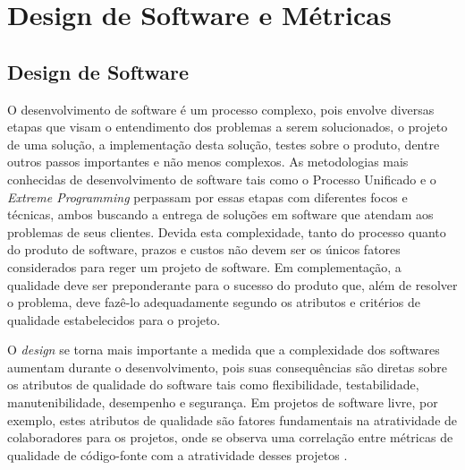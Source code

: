 \chapter{Design de Software e Métricas}
\label{cap-metrics}

\section{Design de Software}
\label{sec-design-sw}

O desenvolvimento de software é um processo complexo, pois envolve diversas etapas que visam o entendimento dos problemas a serem solucionados, o projeto de uma solução, a implementação desta solução, testes sobre o produto, dentre outros passos importantes e não menos complexos. As metodologias mais conhecidas de desenvolvimento de software tais como o Processo Unificado e o \emph{Extreme Programming} perpassam por essas etapas com diferentes focos e técnicas, ambos buscando a entrega de soluções em software que atendam aos problemas de seus clientes. Devida esta complexidade, tanto do processo quanto do produto de software, prazos e custos não devem ser os únicos fatores considerados para reger um projeto de software. Em complementação, a qualidade deve ser preponderante para o sucesso do produto que, além de resolver o problema, deve fazê-lo adequadamente segundo os atributos e critérios de qualidade estabelecidos para o projeto.

%

O \emph{design} se torna mais importante a medida que a complexidade dos softwares aumentam durante o desenvolvimento, pois suas consequências são diretas sobre os atributos de qualidade do software tais como flexibilidade, testabilidade, manutenibilidade, desempenho e segurança. Em projetos de software livre, por exemplo, estes atributos de qualidade são fatores fundamentais na atratividade de colaboradores para os projetos, onde se observa uma correlação entre métricas de qualidade de código-fonte com a atratividade desses projetos \cite{meirelles2013metrics}. 

%


